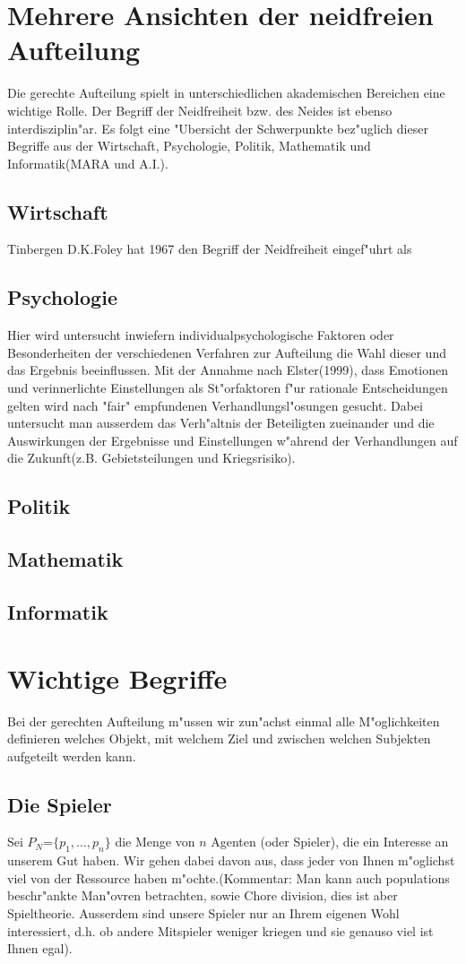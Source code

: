 \documentclass[11pt, a4paper, twoside]{article}
\numberwithin{equation}{section}
\begin{document}
\section{Mehrere Ansichten der neidfreien Aufteilung}
Die gerechte Aufteilung spielt in unterschiedlichen akademischen Bereichen eine wichtige Rolle. Der  Begriff der Neidfreiheit bzw. des Neides ist ebenso interdisziplin"ar.  Es folgt eine "Ubersicht der Schwerpunkte  bez"uglich dieser Begriffe aus der Wirtschaft, Psychologie, Politik, Mathematik und Informatik(MARA und A.I.).
\subsection{Wirtschaft}
Tinbergen
D.K.Foley hat 1967 den Begriff der Neidfreiheit eingef"uhrt als 
\subsection{Psychologie}
Hier wird untersucht inwiefern individualpsychologische Faktoren oder Besonderheiten der verschiedenen Verfahren zur Aufteilung die Wahl dieser und das Ergebnis beeinflussen. Mit der Annahme nach Elster(1999), dass Emotionen und verinnerlichte Einstellungen als St"orfaktoren f"ur rationale  Entscheidungen gelten wird nach "fair" empfundenen Verhandlungsl"osungen gesucht. Dabei untersucht man ausserdem das Verh"altnis der Beteiligten zueinander und die Auswirkungen der Ergebnisse und Einstellungen w"ahrend der Verhandlungen auf die Zukunft(z.B. Gebietsteilungen und Kriegsrisiko). 
\subsection{Politik}
\subsection{Mathematik}
\subsection{Informatik}
\newpage
\section{Wichtige Begriffe}
Bei der gerechten Aufteilung m"ussen wir zun"achst einmal alle M"oglichkeiten definieren welches Objekt, mit welchem Ziel und zwischen welchen Subjekten aufgeteilt werden kann.
\subsection{Die Spieler}
Sei $P_N$=$\{p_1,...,p_n\}$ die Menge von $n$ Agenten (oder Spieler), die ein Interesse an unserem Gut haben. Wir gehen dabei davon aus, dass jeder von Ihnen m"oglichst viel von der Ressource haben m"ochte.(Kommentar: Man kann auch populations beschr"ankte Man"ovren betrachten, sowie Chore division, dies ist aber Spieltheorie. Ausserdem sind unsere Spieler nur an Ihrem eigenen Wohl interessiert, d.h. ob andere Mitspieler weniger kriegen und sie genauso viel ist Ihnen egal).
\end{document}
